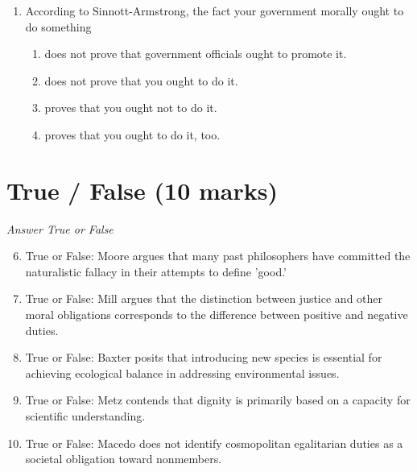\documentclass[12pt]{article}
\begin{document}
\begin{enumerate}[label=\arabic*.]
\begin{enumerate}[label=(\alph*)]
    \item there is no difference between combatants and noncombatants.
    \item the difference between combatants and noncombatants is largely ambiguous.
    \item the difference between combatants and noncombatants is categorical and clear.
\end{enumerate}
\item According to Sinnott-Armstrong, the fact your government morally ought to do something
\begin{enumerate}[label=(\alph*)]
    \item does not prove that government officials ought to promote it.
    \item does not prove that you ought to do it.
    \item proves that you ought not to do it.
    \item proves that you ought to do it, too.
\end{enumerate}
\end{enumerate}

\section*{True / False (10 marks)}
\textit{Answer True or False}
\begin{enumerate}[label=\arabic*.]
\setcounter{enumi}{5}
\item True or False: Moore argues that many past philosophers have committed the naturalistic fallacy in their attempts to define 'good.'
\item True or False: Mill argues that the distinction between justice and other moral obligations corresponds to the difference between positive and negative duties.
\item True or False: Baxter posits that introducing new species is essential for achieving ecological balance in addressing environmental issues.
\item True or False: Metz contends that dignity is primarily based on a capacity for scientific understanding.
\item True or False: Macedo does not identify cosmopolitan egalitarian duties as a societal obligation toward nonmembers.
\end{enumerate}
\end{document}
